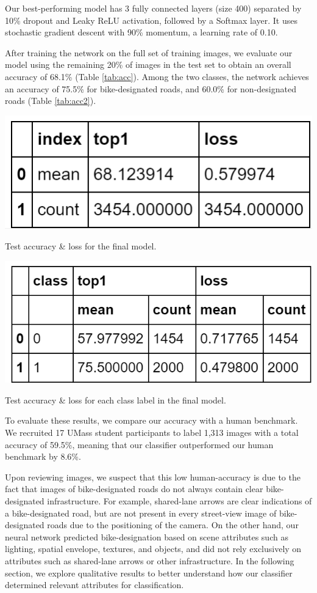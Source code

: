 \documentclass[10pt,twocolumn,letterpaper]{article}
\begin{document}
Our best-performing model has 3 fully connected layers (size 400) separated by 10\% dropout and Leaky ReLU activation, followed by a Softmax layer. It uses stochastic gradient descent with 90\% momentum, a learning rate of 0.10. 

After training the network on the full set of training images, we evaluate our model using the remaining 20\% of images in the test set to obtain an overall accuracy of 68.1\% (Table \ref{tab:acc}). Among the two classes, the network achieves an accuracy of 75.5\% for bike-designated roads, and 60.0\% for non-designated roads (Table \ref{tab:acc2}).

\begin{table}[t]
\begin{center}
	\includegraphics[width=0.7\linewidth]{final_acc_table.png}
\end{center}
   \caption{Test accuracy \& loss for the final model.}
\label{tab:acc}
\end{table}

\begin{table}[t]
\begin{center}
	\includegraphics[width=0.7\linewidth]{final_acc_by_label_table.png}
\end{center}
   \caption{Test accuracy \& loss for each class label in the final model.}
\label{tab:acc2}
\end{table}

To evaluate these results, we compare our accuracy with a human benchmark. We recruited 17 UMass student participants to label 1,313 images with a total accuracy of 59.5\%, meaning that our classifier outperformed our human benchmark by 8.6\%.

Upon reviewing images, we suspect that this low human-accuracy is due to the fact that images of bike-designated roads do not always contain clear bike-designated infrastructure. For example, shared-lane arrows are clear indications of a bike-designated road, but are not present in every street-view image of bike-designated roads due to the positioning of the camera. On the other hand, our neural network predicted bike-designation based on scene attributes such as lighting, spatial envelope, textures, and objects, and did not rely exclusively on attributes such as shared-lane arrows or other infrastructure. In the following section, we explore qualitative results to better understand how our classifier determined relevant attributes for classification.
\end{document}
